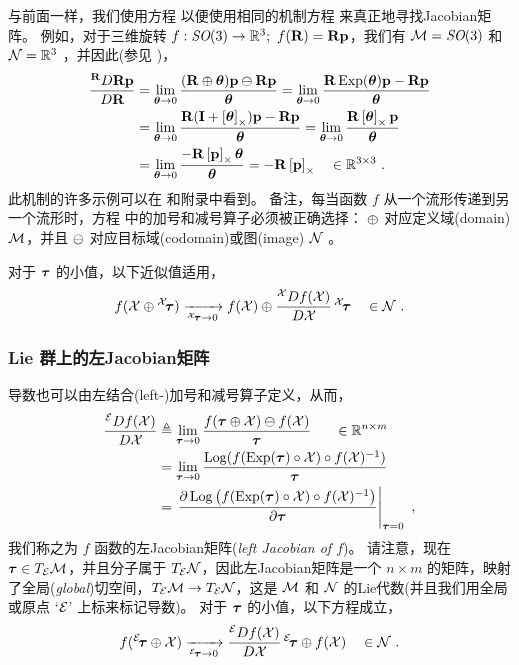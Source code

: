 与前面一样，我们使用方程  以便使用相同的机制方程  来真正地寻找Jacobian矩阵。
%
%
%
例如，对于三维旋转 $f:\textit{SO}(3)\to{\mathbb R}^3;~f({\bf R})={\bf R}{\bf p}$，我们有 $\mathcal{M}=\textit{SO}(3)$ 和 $\mathcal{N}={\mathbb R}^3$ ，并因此(参见 )， 
%
\begin{align*}
\rdpar{\bfR\bfp}{\bfR}
 &= \lim_{\bth\to0}\frac{(\bfR\op\bth)\bfp\om\bfR\bfp}{\bth} 
 = \lim_{\bth\to0}\frac{\bfR\Exp(\bth)\bfp-\bfR\bfp}{\bth} \\
 &= \lim_{\bth\to0}\frac{\bfR(\bfI+\hatx{\bth})\bfp-\bfR\bfp}{\bth} 
 = \lim_{\bth\to0}\frac{\bfR\hatx{\bth}\bfp}{\bth} \\
 &= \lim_{\bth\to0}\frac{-\bfR\hatx{\bfp}\bth}{\bth} 
 = -\bfR\hatx{\bfp} 
 ~~~\in \bbR^{3\times 3}
 ~.
\end{align*}
%
此机制的许多示例可以在  和附录中看到。
%
备注，每当函数 $f$ 从一个流形传递到另一个流形时，方程  中的加号和减号算子必须被正确选择：
$\oplus$ 对应定义域(domain) $\mathcal{M}$，并且 $\ominus$ 对应目标域(codomain)或图(image) $\mathcal{N}$ 。


对于 ${\bm \tau}$ 的小值，以下近似值适用，
%
\begin{align}\label{equ:lin_approx}
f(\cX\op{^\cX\!\bftau}) \xrightarrow[{^\cX\!\bftau}\to0]{} f(\cX)\op\rdpar{f(\cX)}{\cX}\,{^\cX\!\bftau}
\quad \in \cN
~.
\end{align}
%



\subsubsection{Lie 群上的左Jacobian矩阵}

导数也可以由左结合(left-)加号和减号算子定义，从而，
%
\begin{align}\label{equ:left-Jacobian}
\ldpar{f(\cX)}{\cX} 
& \te \lim_{\bftau\to0}\frac{f(\bftau\op\cX)\om f(\cX)}{\bftau}  
~~~~~\in\bbR^{n\times m}
\\
& = \lim_{\bftau\to0}\frac{\Log(f(\Exp(\bftau)\circ\cX) \circ f(\cX)\inv)}{\bftau} \notag
\\
&= \pjac{\Log\big(f(\Exp(\bftau)\circ\cX) \circ f(\cX)\inv\big)}{\bftau}{\bftau=0} \notag
~,
\end{align}
%
我们称之为 $f$ 函数的左Jacobian矩阵(\emph{left Jacobian of $f$})。
请注意，现在 ${\bm \tau}\in T_{\mathcal{E}}{\mathcal{M}}$，并且分子属于 $T_{\mathcal{E}}{\mathcal{N}}$，因此左Jacobian矩阵是一个 $n\times m$ 的矩阵，映射了全局(\emph{global})切空间，$T_{\mathcal{E}}{\mathcal{M}}\to T_{\mathcal{E}}{\mathcal{N}}$，这是 $\mathcal{M}$ 和 $\mathcal{N}$ 的Lie代数(并且我们用全局或原点 `$\mathcal{E}$' 上标来标记导数)。
对于 ${\bm \tau}$ 的小值，以下方程成立，
%
\begin{align}\label{equ:lin_approx_left}
f({^\cE\!\bftau}\op\cX) \xrightarrow[{^\cE\!\bftau}\to0]{} \ldpar{f(\cX)}{\cX}\,{^\cE\!\bftau} \op f(\cX)
\quad \in \cN
~.
\end{align}

